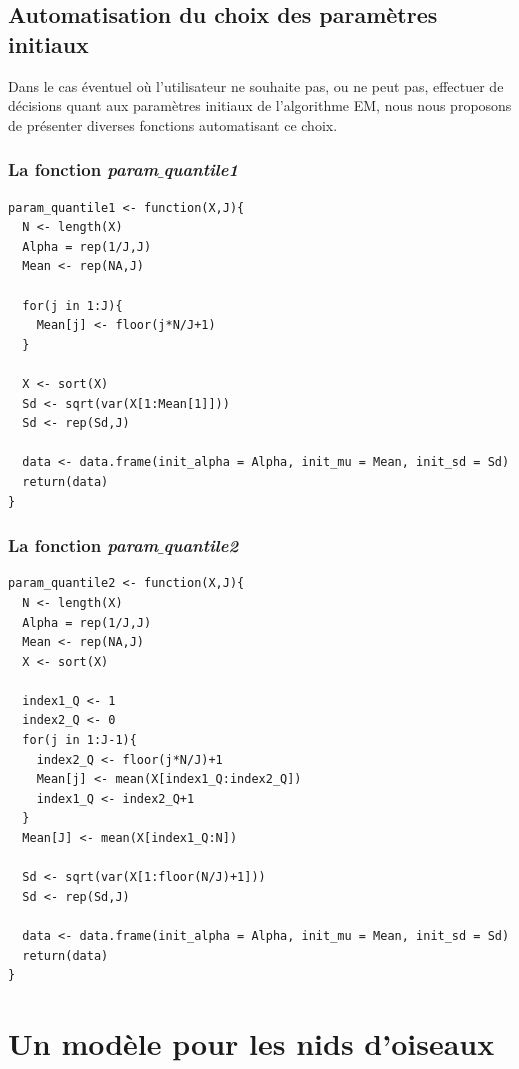 \documentclass[frenchb]{report}
\newcommand{\1}{\mathbbm{1}}
\theoremstyle{definition}\newtheorem{defn}{Définition}
\theoremstyle{definition}\newtheorem{exm}{Exemple}
\theoremstyle{definition}\newtheorem{nota}{Notation}
\theoremstyle{definition}\newtheorem{rem}{Remarque}
\begin{document}
\section{Automatisation du choix des paramètres initiaux}

Dans le cas éventuel où l'utilisateur ne souhaite pas, ou ne peut pas, effectuer de décisions quant aux paramètres initiaux de l'algorithme EM, nous nous proposons de présenter diverses fonctions automatisant ce choix.



\subsection{La fonction \textit{param$\_$quantile1}}

\begin{lstlisting}
param_quantile1 <- function(X,J){
  N <- length(X)
  Alpha = rep(1/J,J)
  Mean <- rep(NA,J)
  
  for(j in 1:J){
    Mean[j] <- floor(j*N/J+1)
  }
  
  X <- sort(X)
  Sd <- sqrt(var(X[1:Mean[1]]))
  Sd <- rep(Sd,J)
  
  data <- data.frame(init_alpha = Alpha, init_mu = Mean, init_sd = Sd)
  return(data)
}
\end{lstlisting}

\subsection{La fonction \textit{param$\_$quantile2}}

\begin{lstlisting}
param_quantile2 <- function(X,J){
  N <- length(X)
  Alpha = rep(1/J,J)
  Mean <- rep(NA,J)
  X <- sort(X)
  
  index1_Q <- 1
  index2_Q <- 0
  for(j in 1:J-1){
    index2_Q <- floor(j*N/J)+1
    Mean[j] <- mean(X[index1_Q:index2_Q])
    index1_Q <- index2_Q+1
  }
  Mean[J] <- mean(X[index1_Q:N])
  
  Sd <- sqrt(var(X[1:floor(N/J)+1]))
  Sd <- rep(Sd,J)
  
  data <- data.frame(init_alpha = Alpha, init_mu = Mean, init_sd = Sd)
  return(data)
}
\end{lstlisting}


\chapter{Un modèle pour les nids d'oiseaux}
\end{document}
